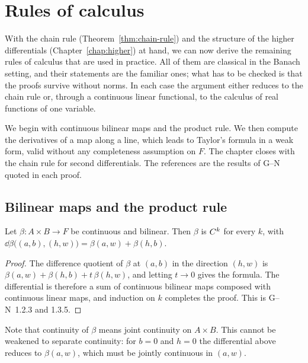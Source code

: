 \chapter{Rules of calculus}
\label{chap:rules}

With the chain rule (Theorem~\ref{thm:chain-rule}) and the structure of the higher
differentials (Chapter~\ref{chap:higher}) at hand, we can now derive the remaining rules of
calculus that are used in practice. All of them are classical in the Banach setting, and their
statements are the familiar ones; what has to be checked is that the proofs survive without
norms. In each case the argument either reduces to the chain rule or, through a continuous
linear functional, to the calculus of real functions of one variable.

We begin with continuous bilinear maps and the product rule. We then compute the derivatives
of a map along a line, which leads to Taylor's formula in a weak form, valid without any
completeness assumption on $F$. The chapter closes with the chain rule for second
differentials. The references are the results of G--N quoted in each proof.

\section{Bilinear maps and the product rule}

\begin{theorem}
  \label{thm:bilinear}
  \leanok
  Let $\beta \colon A \times B \to F$ be continuous and bilinear. Then $\beta$ is $C^{k}$ for
  every $k$, with $\dd \beta\bigl((a, b), (h, w)\bigr) = \beta(a, w) + \beta(h, b)$.
\end{theorem}

\begin{proof}
  \leanok
  The difference quotient of $\beta$ at $(a,b)$ in the direction $(h,w)$ is
  $\beta(a, w) + \beta(h, b) + t\,\beta(h, w)$, and letting $t \to 0$ gives the formula. The
  differential is therefore a sum of continuous bilinear maps composed with continuous linear
  maps, and induction on $k$ completes the proof. This is G--N~1.2.3 and 1.3.5.
\end{proof}

Note that continuity of $\beta$ means joint continuity on $A \times B$. This cannot be
weakened to separate continuity: for $b = 0$ and $h = 0$ the differential above reduces to
$\beta(a, w)$, which must be jointly continuous in $(a, w)$.

